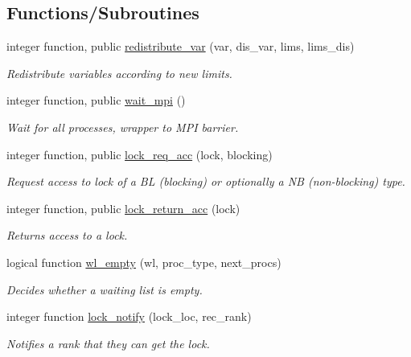 \subsection*{Functions/\+Subroutines}
\begin{DoxyCompactItemize}
\item 
integer function, public \hyperlink{namespacempi__utilities_a128702990bd5fddc582e8fabcffc82b2}{redistribute\+\_\+var} (var, dis\+\_\+var, lims, lims\+\_\+dis)
\begin{DoxyCompactList}\small\item\em Redistribute variables according to new limits. \end{DoxyCompactList}\item 
integer function, public \hyperlink{namespacempi__utilities_a790ea24d32dd0e249541c1e57cd85536}{wait\+\_\+mpi} ()
\begin{DoxyCompactList}\small\item\em Wait for all processes, wrapper to M\+PI barrier. \end{DoxyCompactList}\item 
integer function, public \hyperlink{namespacempi__utilities_a5a789d05be41d6109c01f46cc98620c8}{lock\+\_\+req\+\_\+acc} (lock, blocking)
\begin{DoxyCompactList}\small\item\em Request access to lock of a BL (blocking) or optionally a NB (non-\/blocking) type. \end{DoxyCompactList}\item 
integer function, public \hyperlink{namespacempi__utilities_a86f9982a0f92b51a916f832d9a3d8ba9}{lock\+\_\+return\+\_\+acc} (lock)
\begin{DoxyCompactList}\small\item\em Returns access to a lock. \end{DoxyCompactList}\item 
logical function \hyperlink{namespacempi__utilities_a74e2e82b561f403ca8087c3925f76e29}{wl\+\_\+empty} (wl, proc\+\_\+type, next\+\_\+procs)
\begin{DoxyCompactList}\small\item\em Decides whether a waiting list is empty. \end{DoxyCompactList}\item 
integer function \hyperlink{namespacempi__utilities_a263a30c79639d97f5faffdb566b5a811}{lock\+\_\+notify} (lock\+\_\+loc, rec\+\_\+rank)
\begin{DoxyCompactList}\small\item\em Notifies a rank that they can get the lock. \end{DoxyCompactList}\item 

\end{DoxyCompactItemize}
